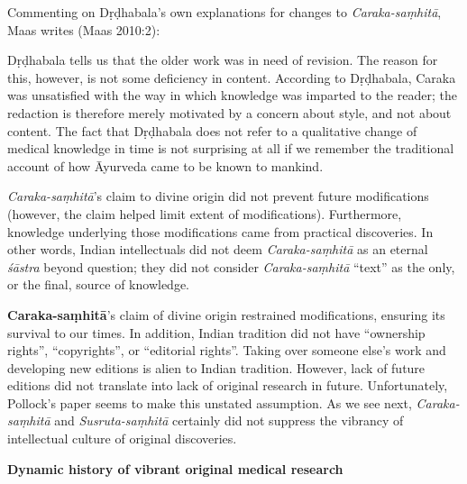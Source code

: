 Commenting on Dṛḍhabala's own explanations for changes to {\sl Caraka-saṃhitā}, Maas writes (Maas 2010:2): 
\begin{myquote}
Dṛḍhabala tells us that the older work was in need of revision. The reason for this, however, is not some deficiency in content. According to Dṛḍhabala, Caraka was unsatisfied with the way in which knowledge was imparted to the reader; the redaction is therefore merely motivated by a concern about style, and not about content. The fact that Dṛḍhabala does not refer to a qualitative change of medical knowledge in time is not surprising at all if we remember the traditional account of how Āyurveda came to be known to mankind.
\end{myquote}

{\sl Caraka-saṃhitā}'s claim to divine origin did not prevent future modifications (however, the claim helped limit extent of modifications).  Furthermore, knowledge underlying those modifications came from practical discoveries.  In other words, Indian intellectuals did not deem {\sl Caraka-saṃhitā} as an eternal {\sl śāstra} beyond question; they did not consider {\sl Caraka-saṃhitā} ``text'' as the only, or the final, source of knowledge.

{\bf Caraka-saṃhitā}'s claim of divine origin restrained modifications, ensuring its survival to our times. In addition, Indian tradition did not have ``ownership rights'', ``copyrights'', or ``editorial rights''.  Taking over someone else's work and developing new editions is alien to Indian tradition.  However, lack of future editions did not translate into lack of original research in future.  Unfortunately, Pollock's paper seems to make this unstated assumption. As we see next, {\sl Caraka-saṃhitā} and {\sl Susruta-saṃhitā} certainly did not suppress the vibrancy of intellectual culture of original discoveries.

{\bf Dynamic history of vibrant original medical research}


